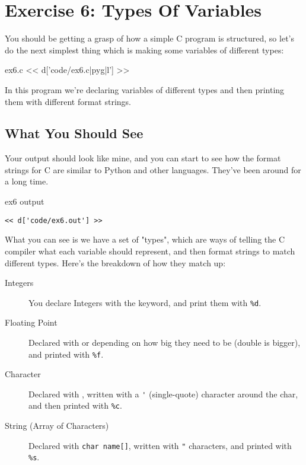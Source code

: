 \chapter{Exercise 6: Types Of Variables}

You should be getting a grasp of how a simple C program is structured,
so let's do the next simplest thing which is making some variables 
of different types:

\begin{code}{ex6.c}
<< d['code/ex6.c|pyg|l'] >>
\end{code}

In this program we're declaring variables of different types 
and then printing them with different  format
strings.

\section{What You Should See}

Your output should look like mine, and you can start to see how
the format strings for C are similar to Python and other languages.
They've been around for a long time.

\begin{code}{ex6 output}
\begin{lstlisting}
<< d['code/ex6.out'] >>
\end{lstlisting}
\end{code}

What you can see is we have a set of "types", which are ways of
telling the C compiler what each variable should represent, and then
format strings to match different types.  Here's the breakdown
of how they match up:

\begin{description}
\item[Integers] You declare Integers with the  keyword, and 
    print them with \verb|%d|.
\item[Floating Point] Declared with  or  depending
    on how big they need to be (double is bigger), and printed with 
    \verb|%f|.
\item[Character] Declared with , written with a \verb|'| (single-quote)
    character around the char, and then printed with \verb|%c|.
\item[String (Array of Characters)] Declared with \verb|char name[]|, 
    written with \verb|"| characters, and printed with \verb|%s|.
\end{description}

